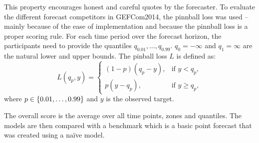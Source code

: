 This property encourages honest and careful quotes by the forecaster. 
To evaluate the different forecast competitors in GEFCom2014, 
the pinnball loss was used -- mainly because of the ease of implementation 
and because the pinnball loss is a proper scoring rule.
For each time period over the forecast horizon, the participants need to 
provide the quantiles \(q_{0.01}, \ldots, q_{0.99}\). 
\(q_0 = -\infty\) and \(q_1 = \infty\) are the natural lower and upper bounds.
The pinball loss \(L\) is defined as: 
\[ L(q_p, y) = \begin{cases}
    (1-p)(q_p - y), &\text{if } y < q_p, \\
    p(y - q_p), &\text{if } y \geq q_p,
\end{cases} \]
where \(p \in \{0.01, \ldots, 0.99\}\) and \(y\) is the observed target.

The overall score is the average over all time points, zones and quantiles.
The models are then compared with a benchmark which is a basic point forecast 
that was created using a na\"{i}ve model.